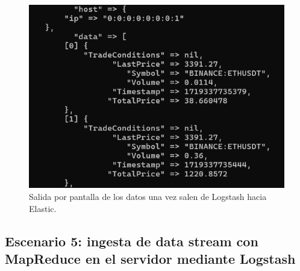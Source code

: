 \begin{figure}
    \centering
    \includegraphics[width=1\linewidth]{img/salida2.png}
    \caption{Salida por pantalla de los datos una vez salen de Logstash hacia Elastic.}
    \label{fig:salida2}
\end{figure}
\paragraph{}
\paragraph{}
\paragraph{}
\paragraph{}
\paragraph{}
\paragraph{}
\paragraph{}



\subsection{Escenario 5: ingesta de data stream con MapReduce en el servidor mediante Logstash}

